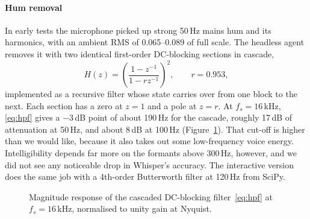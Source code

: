 \documentclass[11pt,a4paper,oneside]{report}
\theoremstyle{definition}
\begin{document}
\paragraph{Hum removal} In early tests the microphone picked up strong 50\,Hz mains hum and its harmonics, with an ambient RMS of 0.065--0.089 of full scale. The headless agent removes it with two identical first-order DC-blocking sections in cascade,
\begin{equation}
  H(z) = \left(\frac{1 - z^{-1}}{1 - r z^{-1}}\right)^{2}, \qquad r = 0.953,
  \label{eq:hpf}
\end{equation}
implemented as a recursive filter whose state carries over from one block to the next. Each section has a zero at $z=1$ and a pole at $z=r$. At $f_s = 16$\,kHz, \eqref{eq:hpf} gives a $-3$\,dB point of about 190\,Hz for the cascade, roughly 17\,dB of attenuation at 50\,Hz, and about 8\,dB at 100\,Hz (Figure~\ref{fig:hpf}). That cut-off is higher than we would like, because it also takes out some low-frequency voice energy. Intelligibility depends far more on the formants above 300\,Hz, however, and we did not see any noticeable drop in Whisper's accuracy. The interactive version does the same job with a 4th-order Butterworth filter at 120\,Hz from SciPy.

\begin{figure}[ht]
\centering
{}
\caption{Magnitude response of the cascaded DC-blocking filter~\eqref{eq:hpf} at $f_s=16$\,kHz, normalised to unity gain at Nyquist.}
\label{fig:hpf}
\end{figure}
\end{document}
